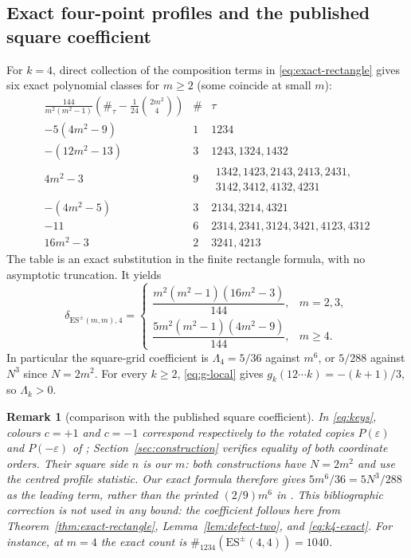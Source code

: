 \documentclass[11pt,letterpaper]{article}
\newtheorem{remark}[theorem]{Remark}
\begin{document}
\subsection{Exact four-point profiles and the published square coefficient}
For $k=4$, direct collection of the composition terms in
\eqref{eq:exact-rectangle} gives six exact polynomial classes for $m\ge2$
(some coincide at small $m$):
\[
\begin{array}{c|c|l}
\displaystyle
 \frac{144}{m^2(m^2-1)}
 \left(\#_\tau-\frac1{24}\binom{2m^2}{4}\right)
 &\#&\tau\\ \hline
 -5(4m^2-9)&1&1234\\
 -(12m^2-13)&3&1243,1324,1432\\
 4m^2-3&9&\begin{gathered}1342,1423,2143,2413,2431,\\
                         3142,3412,4132,4231\end{gathered}\\
 -(4m^2-5)&3&2134,3214,4321\\
 -11&6&2314,2341,3124,3421,4123,4312\\
 16m^2-3&2&3241,4213
\end{array}
\]
The table is an exact substitution in the finite rectangle formula, with no
asymptotic truncation.  It yields
\begin{equation}\label{eq:k4-exact}
\delta_{\mathrm{ES}^{\pm}(m,m),4}
=\begin{cases}
 \dfrac{m^2(m^2-1)(16m^2-3)}{144},&m=2,3,\\[4pt]
 \dfrac{5m^2(m^2-1)(4m^2-9)}{144},&m\ge4.
\end{cases}
\end{equation}
In particular the square-grid coefficient is $\Lambda_4=5/36$ against
$m^6$, or $5/288$ against $N^3$ since $N=2m^2$.  For every $k\ge2$, \eqref{eq:g-local} gives
$g_k(12\cdots k)=-(k+1)/3$, so $\Lambda_k>0$.

\begin{remark}[comparison with the published square coefficient]
\label{rem:bll-correction}
In \eqref{eq:keys}, colours $c=+1$ and $c=-1$ correspond respectively
to the rotated copies $P(\varepsilon)$ and $P(-\varepsilon)$ of
\cite[Definitions~5.3 and 5.6]{BLL}; Section~\ref{sec:construction}
verifies equality of both coordinate orders.
Their square side $n$ is our $m$: both constructions have $N=2m^2$
and use the centred profile statistic.  Our exact formula therefore
gives $5m^6/36=5N^3/288$ as the leading term, rather than the printed
$(2/9)m^6$ in
\cite[Theorem~8]{BLL}.  This bibliographic correction is not used in any
bound: the coefficient follows here from
Theorem~\ref{thm:exact-rectangle}, Lemma~\ref{lem:defect-two}, and
\eqref{eq:k4-exact}.  For instance, at $m=4$ the exact count is
$\#_{1234}(\mathrm{ES}^{\pm}(4,4))=1040$.
\end{remark}
\end{document}

